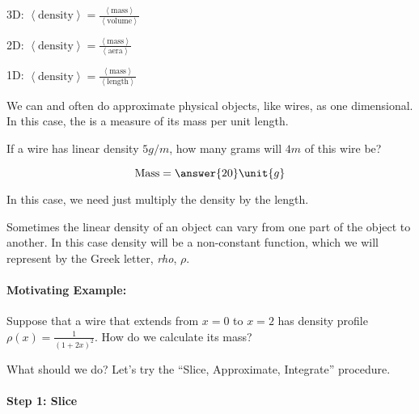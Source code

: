 \documentclass{ximera}
\begin{document}
3D: $\left<\textrm{density}\right> = \frac{\left<\textrm{mass}\right>}{\left<\textrm{volume}\right>}$

2D: $\left<\textrm{density}\right> = \frac{\left<\textrm{mass}\right>}{\left<\textrm{aera}\right>}$

1D: $\left<\textrm{density}\right> = \frac{\left<\textrm{mass}\right>}{\left<\textrm{length}\right>}$

We can and often do approximate physical objects, like wires, as one dimensional.  In this case, the  is a measure of its mass per unit length.

\begin{question}
  If a wire has linear density $5 \unit{g}/\unit{m}$, how many grams
  will $4 \unit{m}$ of this wire be?
  \begin{prompt}
  \[
  \mathrm{Mass} = \answer{20} \unit{g}
  \]
  \end{prompt}
  \begin{hint}
    In this case, we need just multiply the density by the length.
  \end{hint}
\end{question}

Sometimes the linear density of an object can vary from one part of
the object to another. In this case density will be a non-constant function, which we will represent by the Greek letter, \textit{rho}, $\rho$.

\paragraph{Motivating Example:} Suppose that a wire that extends from $x=0$ to $x=2$ has density profile $\rho(x) = \frac{1}{(1+2x)^2}$.  How do we calculate its mass?

\begin{multipleChoice}
\end{multipleChoice}

What should we do?  Let's try the ``Slice, Approximate, Integrate'' procedure.

\paragraph{Step 1: Slice}
\end{document}
